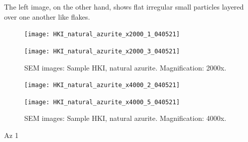 The left image, on the other hand, shows flat irregular small particles layered over one another like flakes.

\begin{figure}[H]
\centering
\begin{minipage}{.45\textwidth}
  \centering
  \texttt{[image: HKI\_natural\_azurite\_x2000\_1\_040521]}
\end{minipage}
\begin{minipage}{.45\textwidth}
  \centering
  \texttt{[image: HKI\_natural\_azurite\_x2000\_3\_040521]}
\end{minipage}
\caption[SEM images: Sample HKI, natural azurite]{SEM images: Sample HKI, natural azurite. Magnification: 2000x.}
\label{fig:hki_nat_az_sem_4}
\end{figure}

\begin{figure}[H]
\centering
\begin{minipage}{.45\textwidth}
  \centering
  \texttt{[image: HKI\_natural\_azurite\_x4000\_2\_040521]}
\end{minipage}
\begin{minipage}{.45\textwidth}
  \centering
  \texttt{[image: HKI\_natural\_azurite\_x4000\_5\_040521]}
\end{minipage}
\caption[SEM images: Sample HKI, natural azurite]{SEM images: Sample HKI, natural azurite. Magnification: 4000x.}
\label{fig:hki_nat_az_sem_5}
\end{figure}



Az 1


